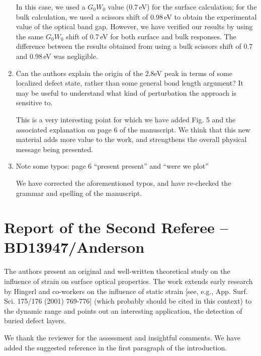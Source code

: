 \documentclass[aps,prb,10pt,endfloats]{revtex4-1}
\begin{document}
\begin{enumerate}
\begin{shaded*}
In this case, we used a $G_{0}W_{0}$ value (0.7\,eV) for the surface
calculation; for the bulk calculation, we used a scissors shift of 0.98\,eV to
obtain the experimental value of the optical band gap. However, we have verified
our results by using the same $G_{0}W_{0}$ shift of 0.7\,eV for both surface and
bulk responses. The difference between the results obtained from using a bulk
scissors shift of 0.7 and 0.98\,eV was negligible.
\end{shaded*}

\item Can the authors explain the origin of the 2.8eV peak in terms of some
localized defect state, rather than some general bond length argument? It may be
useful to understand what kind of perturbation the approach is sensitive to.
\begin{shaded*}
This is a very interesting point for which we have added Fig. 5 and the
associated explanation on page 6 of the manuscript. We think that this new
material adds more value to the work, and strengthens the overall physical
message being presented.
\end{shaded*}

\item Note some typos: page 6 ``present present'' and ``were we plot''
\begin{shaded*}
We have corrected the aforementioned typos, and have re-checked the grammar and
spelling of the manuscript.
\end{shaded*}

\end{enumerate}


\section{Report of the Second Referee -- BD13947/Anderson}

The authors present an original and well-written theoretical study on the
influence of strain on surface optical properties. The work extends early
research by Hingerl and co-workers on the influence of static strain [see, e.g.,
App. Surf. Sci. 175/176 (2001) 769-776] (which probably should be cited in this
context) to the dynamic range and points out an interesting application, the
detection of buried defect layers.
\begin{shaded*}
We thank the reviewer for the assessment and insightful comments. We have added
the suggested reference in the first paragraph of the introduction.
\end{shaded*}
\end{document}
